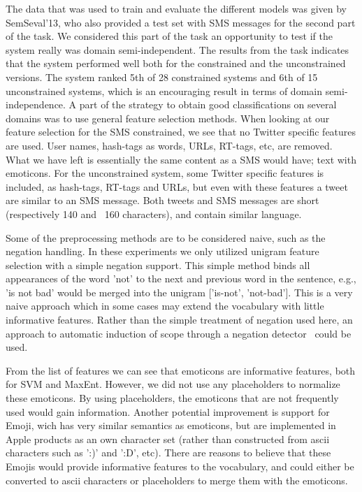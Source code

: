 The data that was used to train and evaluate the different models was given by SemSeval'13, who also provided a test set with SMS messages for the second part of the task. We considered this part of the task an opportunity to test if the system really was domain semi-independent. The results from the task indicates that the system performed well both for the constrained and the unconstrained versions. The system ranked 5th of 28 constrained systems and 6th of 15 unconstrained systems, which is an encouraging result in terms of domain semi-independence. A part of the strategy to obtain good classifications on several domains was to use general feature selection methods. When looking at our feature selection for the SMS constrained, we see that no Twitter specific features are used. User names, hash-tags as words, URLs, RT-tags, etc, are removed. What we have left is essentially the same content as a SMS would have; text with emoticons. For the unconstrained system, some Twitter specific features is included, as hash-tags, RT-tags and URLs, but even with these features a tweet are similar to an SMS message. Both tweets and SMS messages are short (respectively 140 and ~160 characters), and contain similar language. 

Some of the preprocessing methods are to be considered naive, such as the negation handling. In these experiments we only utilized unigram feature selection with a simple negation support. This simple method binds all appearances of the word 'not' to the next and previous word in the sentence, e.g., 'is not bad' would be merged into the unigram ['is-not', 'not-bad']. This is a very naive approach which in some cases may extend the vocabulary with little informative features. Rather than the simple treatment of negation used here, an approach to automatic induction of scope through a negation detector~\citep{CouncillEA:10} could be used.

From the list of features we can see that emoticons are informative features, both for SVM and MaxEnt. However, we did not use any placeholders to normalize these emoticons. By using placeholders, the emoticons that are not frequently used would gain information. Another potential improvement is support for Emoji, wich has very similar semantics as emoticons, but are implemented in Apple products as an own character set (rather than constructed from ascii characters such as ':)' and ':D', etc). There are reasons to believe that these Emojis would provide informative features to the vocabulary, and could either be converted to ascii characters or placeholders to merge them with the emoticons.

